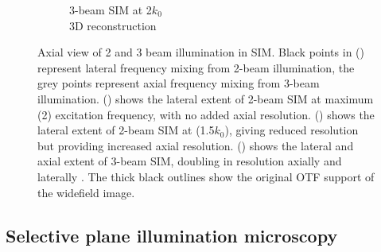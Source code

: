 \begin{figure}
\begin{subfigure}{0.48\textwidth}
        \caption{3-beam SIM at \SI{2}{\times}$k_0$\\3D reconstruction}
        \label{fig:sim_axial_3_beam}
    \end{subfigure}
    \caption{
    Axial view of 2 and 3 beam illumination in SIM.
    Black points in () represent lateral frequency mixing from 2-beam illumination, the grey points represent axial frequency mixing from 3-beam illumination.
    () shows the lateral extent of 2-beam SIM at maximum (\SI{2}{\times}) excitation frequency, with no added axial resolution.
    () shows the lateral extent of 2-beam SIM at (\SI{1.5}{\times}$k_0$), giving reduced resolution but providing increased axial resolution.
     () shows the lateral and axial extent of 3-beam SIM, doubling in resolution axially and laterally \cite{gustasson}.
     The thick black outlines show the original OTF support of the widefield image.    %
    }
    \label{fig:sim_axial}
\end{figure}


%



\subsection{Selective plane illumination microscopy}

